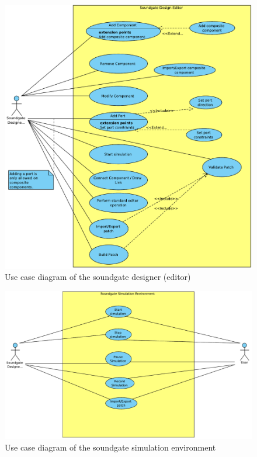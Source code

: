 	\begin{figure}[!h]
		\centering
			\includegraphics[width=\textwidth]{images/Soundgate_Designer.pdf}
		\caption{Use case diagram of the soundgate designer (editor)}
		\label{fig:Soundgate_Designer}
	\end{figure}
	
	\begin{figure}[!h]
		\centering
			\includegraphics[width=\textwidth]{images/Soundgate_Simulator.pdf}
		\caption{Use case diagram of the soundgate simulation environment}
		\label{fig:Soundgate_Simulator}
	\end{figure}
	
